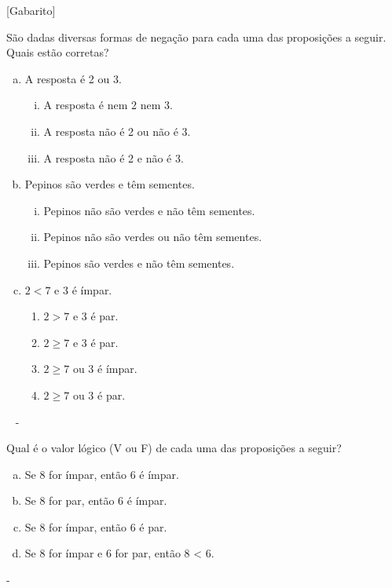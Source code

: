 \documentclass[a4paper, 12pt, addpoints]{exam}
\begin{document}
\info\vspace{-1 cm} %
[Gabarito]
\begin{questions}%
  \question São dadas diversas formas de negação para cada uma das proposições a seguir.
  Quais estão corretas?

  \begin{enumerate}[a)]
    \item  A resposta é 2 ou 3.
          \begin{enumerate}[i.]
            \item A resposta é nem 2 nem 3.
            \item A resposta não é 2 ou não é 3.
            \item A resposta não é 2 e não é 3.
          \end{enumerate}
    \item Pepinos são verdes e têm sementes.
          \begin{enumerate}[i.]
            \item Pepinos não são verdes e não têm sementes.
            \item Pepinos não são verdes ou não têm sementes.
            \item Pepinos são verdes e não têm sementes.
          \end{enumerate}
    \item $ 2 < 7 $ e $3$ é ímpar.
          \begin{enumerate}
            \item $2 > 7$ e 3 é par.
            \item $2 \geq 7$ e 3 é par.
            \item $2 \geq  7$ ou 3 é ímpar.
            \item $2 \geq  7$ ou 3 é par.
          \end{enumerate}
  \end{enumerate}

  \begin{resp}~
    -
  \end{resp}

  \question  Qual é o valor lógico (V ou F) de cada uma das proposições a seguir?
  \begin{multicols}{2}
    \begin{enumerate}[a)]
      \item Se 8 for ímpar, então 6 é ímpar.
      \item Se 8 for par, então 6 é ímpar.
      \item Se 8 for ímpar, então 6 é par.
      \item Se 8 for ímpar e 6 for par, então 8 < 6.
    \end{enumerate}
  \end{multicols}
  \begin{resp}
    -
  \end{resp}


\end{questions}
\end{document}
